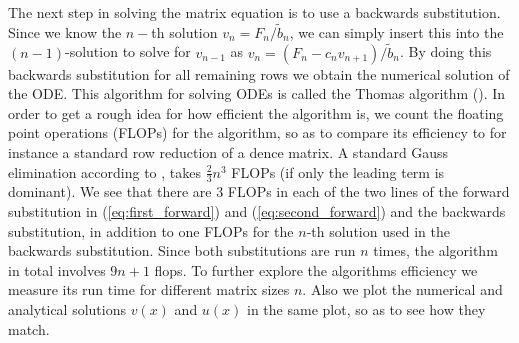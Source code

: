 \documentclass[twocolumn]{aastex62}
\begin{document}
The next step in solving the matrix equation is to use a backwards substitution. Since we know the $n-$th solution $v_n = F_n/\tilde{b}_n$, we can simply insert this into the $(n-1)$-solution to solve for $v_{n-1}$ as $v_{n} = (F_{n} - c_{n}v_{n+1})/ \tilde{b}_{n}$. By doing this backwards substitution for all remaining rows we obtain the numerical solution of the ODE. This algorithm for solving ODEs is called the Thomas algorithm (\cite{Jensen:2015}). In order to get a rough idea for how efficient the algorithm is, we count the floating point operations (FLOPs) for the algorithm, so as to compare its efficiency to for instance a standard row reduction of a dence matrix. A standard Gauss elimination according to \citep{Boyd:2004}, takes $\frac{2}{3}n^3$ FLOPs (if only the leading term is dominant). We see that there are 3 FLOPs in each of the two lines of the forward substitution in (\ref{eq:first_forward}) and (\ref{eq:second_forward}) and the backwards substitution, in addition to one FLOPs for the $n$-th solution used in the backwards substitution. Since both substitutions are run $n$ times, the algorithm in total involves $9n + 1$ flops. To further explore the algorithms efficiency we measure its run time for different matrix sizes $n$. Also we plot the numerical and analytical solutions $v(x)$ and $u(x)$ in the same plot, so as to see how they match. 
\end{document}

